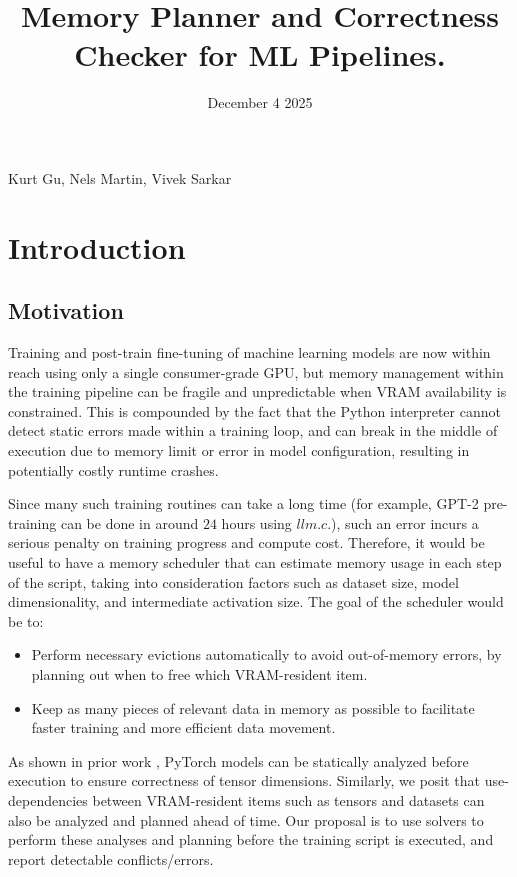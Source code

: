 \documentclass{nfr}
\title{Memory Planner and Correctness Checker for ML Pipelines.}
\date{December 4 2025}
\begin{document}
\maketitle
\centerline{Kurt Gu, Nels Martin, Vivek Sarkar}
\section{Introduction}

\subsection{Motivation}

Training and post-train fine-tuning of machine learning models are now within reach using only a single consumer-grade GPU, but memory management within the training pipeline can be fragile and unpredictable when VRAM availability is constrained. This is compounded by the fact that the Python interpreter cannot detect static errors made within a training loop, and can break in the middle of execution due to memory limit or error in model configuration, resulting in potentially costly runtime crashes.

Since many such training routines can take a long time (for example, GPT-2 pre-training can be done in around $24$ hours using $llm.c$\cite{llmc}.), such an error incurs a serious penalty on training progress and compute cost. Therefore, it would be useful to have a memory scheduler that can estimate memory usage in each step of the script, taking into consideration factors such as dataset size, model dimensionality, and intermediate activation size. 
The goal of the scheduler would be to:
\begin{itemize}
    \item Perform necessary evictions automatically to avoid out-of-memory errors, by planning out when to free which VRAM-resident item.
    \item Keep as many pieces of relevant data in memory as possible to facilitate faster training and more efficient data movement.
\end{itemize}

As shown in prior work \cite{analyzer}, PyTorch models can be statically analyzed before execution to ensure correctness of tensor dimensions. Similarly, we posit that use-dependencies between VRAM-resident items such as tensors and datasets can also be analyzed and planned ahead of time. Our proposal is to use solvers to perform these analyses and planning before the training script is executed, and report detectable conflicts/errors.
\end{document}
